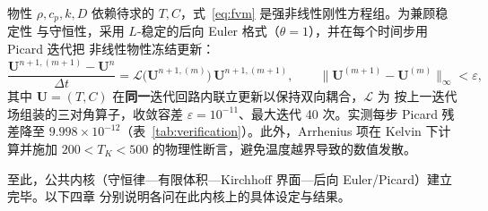 物性 $\rho,c_p,k,D$ 依赖待求的 $T,C$，式~\eqref{eq:fvm} 是强非线性刚性方程组。为兼顾稳定性
与守恒性，采用 $L$-稳定的后向 Euler 格式（$\theta=1$），并在每个时间步用 Picard 迭代把
非线性物性冻结更新：
\begin{equation}\label{eq:picard}
\frac{\mathbf{U}^{n+1,(m+1)}-\mathbf{U}^{n}}{\Delta t}
=\mathcal{L}\!\big(\mathbf{U}^{n+1,(m)}\big)\,\mathbf{U}^{n+1,(m+1)},
\qquad
\big\|\mathbf{U}^{(m+1)}-\mathbf{U}^{(m)}\big\|_\infty<\varepsilon ,
\end{equation}
其中 $\mathbf{U}=(T,C)$ 在\textbf{同一}迭代回路内联立更新以保持双向耦合，$\mathcal{L}$ 为
按上一迭代场组装的三对角算子，收敛容差 $\varepsilon=10^{-11}$、最大迭代 40 次。实测每步
Picard 残差降至 $9.998\times10^{-12}$（表~\ref{tab:verification}）。此外，Arrhenius 项在
Kelvin 下计算并施加 $200<T_K<500$ 的物理性断言，避免温度越界导致的数值发散。

至此，公共内核（守恒律—有限体积—Kirchhoff 界面—后向 Euler/Picard）建立完毕。以下四章
分别说明各问在此内核上的具体设定与结果。
